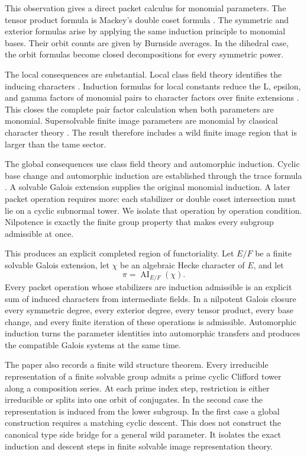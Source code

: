 \documentclass{aomart}
\theoremstyle{definition}
\theoremstyle{remark}
\newcommand{\AI}{\operatorname{AI}}
\begin{document}
This observation gives a direct packet calculus for monomial parameters. The tensor product formula is Mackey's double coset formula \cite{Mackey1952}. The symmetric and exterior formulas arise by applying the same induction principle to monomial bases. Their orbit counts are given by Burnside averages. In the dihedral case, the orbit formulas become closed decompositions for every symmetric power.

The local consequences are substantial. Local class field theory identifies the inducing characters \cite{Serre1967,Tate1979}. Induction formulas for local constants reduce the L, epsilon, and gamma factors of monomial pairs to character factors over finite extensions \cite{Deligne1973}. This closes the complete pair factor calculation when both parameters are monomial. Supersolvable finite image parameters are monomial by classical character theory \cite{Isaacs1976,Serre1977}. The result therefore includes a wild finite image region that is larger than the tame sector.

The global consequences use class field theory and automorphic induction. Cyclic base change and automorphic induction are established through the trace formula \cite{ArthurClozel1989,Langlands1980}. A solvable Galois extension supplies the original monomial induction. A later packet operation requires more: each stabilizer or double coset intersection must lie on a cyclic subnormal tower. We isolate that operation by operation condition. Nilpotence is exactly the finite group property that makes every subgroup admissible at once.

This produces an explicit completed region of functoriality. Let \(E/F\) be a finite solvable Galois extension, let \(\chi\) be an algebraic Hecke character of \(E\), and let
\[
\pi=\AI_{E/F}(\chi).
\]
Every packet operation whose stabilizers are induction admissible is an explicit sum of induced characters from intermediate fields. In a nilpotent Galois closure every symmetric degree, every exterior degree, every tensor product, every base change, and every finite iteration of these operations is admissible. Automorphic induction turns the parameter identities into automorphic transfers and produces the compatible Galois systems at the same time.

The paper also records a finite wild structure theorem. Every irreducible representation of a finite solvable group admits a prime cyclic Clifford tower along a composition series. At each prime index step, restriction is either irreducible or splits into one orbit of conjugates. In the second case the representation is induced from the lower subgroup. In the first case a global construction requires a matching cyclic descent. This does not construct the canonical type side bridge for a general wild parameter. It isolates the exact induction and descent steps in finite solvable image representation theory.
\end{document}
